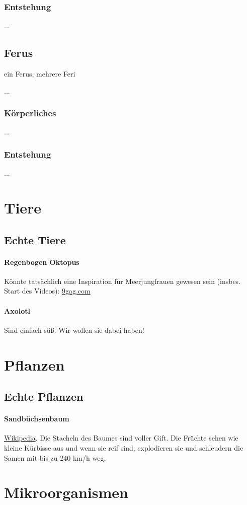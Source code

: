 \subsubsection{Entstehung}
...


\subsection{Ferus} \label{rasse:ferus}
ein Ferus, mehrere Feri
\begin{outline}
	\1 ...
\end{outline}

\subsubsection{Körperliches}
\begin{outline}
	\1 ...
\end{outline}

\subsubsection{Entstehung}
...



\section{Tiere}
\subsection{Echte Tiere}
\paragraph{Regenbogen Oktopus} Könnte tatsächlich eine Inspiration für Meerjungfrauen gewesen sein (insbes. Start des Videos): \href{https://img-9gag-fun.9cache.com/photo/aVYpQVK\_460svvp9.webm}{9gag.com}
\paragraph{Axolotl} Sind einfach süß. Wir wollen sie dabei haben!

\section{Pflanzen}
\subsection{Echte Pflanzen}
\paragraph{Sandbüchsenbaum} \href{https://de.wikipedia.org/wiki/Sandb\%C3\%BCchsenbaum}{Wikipedia}. Die Stacheln des Baumes sind voller Gift. Die Früchte sehen wie kleine Kürbisse aus und wenn sie reif sind, explodieren sie und schleudern die Samen mit bis zu 240 km/h weg.

\section{Mikroorganismen}
